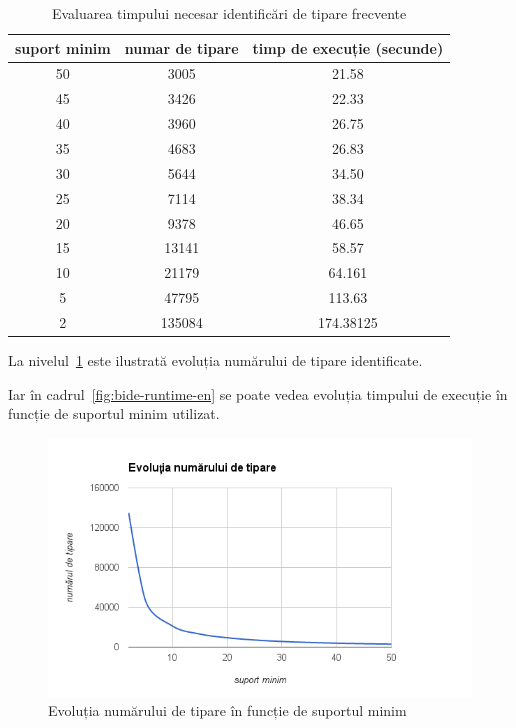 \begin{table}[h!]
\centering
\begin{tabular}{|c|c|c|}
\hline
suport minim & numar de tipare & timp de execuție (secunde)\\ 
\hline
50 & 3005 & 21.58\\ 
\hline
45 & 3426 & 22.33\\ 
\hline
40 & 3960 & 26.75\\ 
\hline
35 & 4683 & 26.83\\ 
\hline
30 & 5644 & 34.50\\ 
\hline
25 & 7114 & 38.34\\ 
\hline
20 & 9378 & 46.65\\ 
\hline
15 & 13141 & 58.57\\ 
\hline
10 & 21179 & 64.161\\ 
\hline
5 & 47795 & 113.63\\ 
\hline
2 & 135084 & 174.38125\\ 
\hline
\hline\end{tabular}
\label{table:bide-en}
\caption{Evaluarea timpului necesar identificări de tipare frecvente} 
\end{table}


La nivelul~\ref{fig:bide-count-en} este ilustrată evoluția numărului de tipare identificate.

Iar în cadrul~\ref{fig:bide-runtime-en} se poate vedea evoluția timpului de execuție în funcție de suportul minim utilizat.

\newpage
\begin{figure}[h!]
    \centering
    \includegraphics[width=.9\textwidth]{figures/bide-count-en.png}
    \caption{Evoluția numărului de tipare în funcție de suportul minim}
    \label{fig:bide-count-en}
\end{figure}

